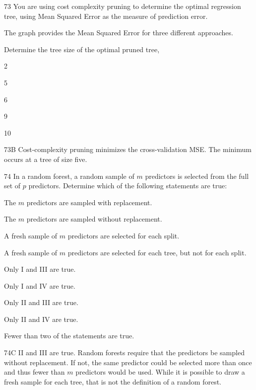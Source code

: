 \begin{question}{73}
You are using cost complexity pruning to determine the optimal regression tree, using Mean Squared Error as the measure of prediction error.

The graph provides the Mean Squared Error for three different approaches.


Determine the tree size of the optimal pruned tree,

\begin{choices}
\item 2
\item 5
\item 6
\item 9
\item 10
\end{choices}
\end{question}
\begin{solution}{73}{B}
Cost-complexity pruning minimizes the cross-validation MSE. The minimum occurs at a tree of size five.
\end{solution}

\begin{question}{74}
In a random forest, a random sample of $m$ predictors is selected from the full set of $p$ predictors. Determine which of the following statements are true:

\begin{statements}
\item The $m$ predictors are sampled with replacement.
\item The $m$ predictors are sampled without replacement.
\item A fresh sample of $m$ predictors are selected for each split.
\item A fresh sample of $m$ predictors are selected for each tree, but not for each split.
\end{statements}

\begin{choices}
\item Only I and III are true.
\item Only I and IV are true.
\item Only II and III are true.
\item Only II and IV are true.
\item Fewer than two of the statements are true.
\end{choices}
\end{question}
\begin{solution}{74}{C}
II and III are true. Random forests require that the predictors be sampled without replacement. If not, the same predictor could be selected more than once and thus fewer than $m$ predictors would be used. While it is possible to draw a fresh sample for each tree, that is not the definition of a random forest.
\end{solution}

